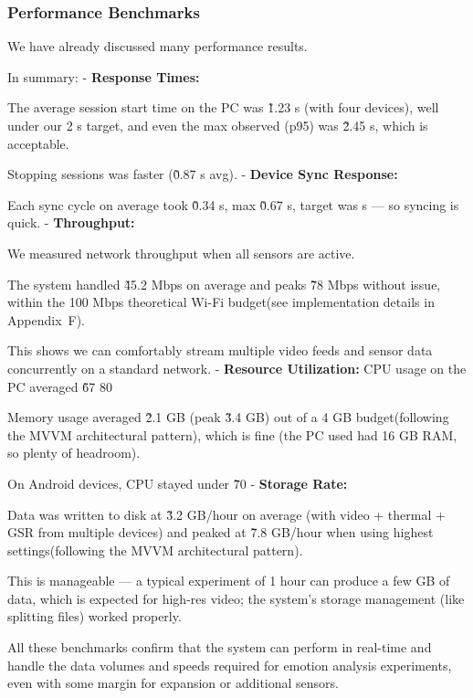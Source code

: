 {{{{{{{\subsubsection{Performance Benchmarks}

We have already discussed many performance results.

In summary: - \textbf{Response Times:}

The average session start time on the PC was \~1.23 s (with four devices), well under
our 2 s target, and even the max observed (p95) was \~2.45 s, which is acceptable.

Stopping sessions was faster (\~0.87 s avg). - \textbf{Device Sync Response:}

Each sync cycle on average took \~0.34 s, max \~0.67 s, target was  s --- so
syncing is quick.  - \textbf{Throughput:}

We measured network throughput when all sensors are active.

The system handled \~45.2 Mbps on average and peaks \~78 Mbps without issue, within
the 100 Mbps theoretical Wi-Fi budget(see implementation details in Appendix~F).

This shows we can comfortably stream multiple video feeds and sensor data
concurrently on a standard network.  - \textbf{Resource Utilization:}
 CPU usage on the PC averaged \~67%
 80%

Memory usage averaged \~2.1 GB (peak \~3.4 GB) out of a 4 GB budget(following the
MVVM architectural pattern), which is fine (the PC used had 16 GB RAM, so plenty of
headroom).

On Android devices, CPU stayed under \~70%
- \textbf{Storage Rate:}

Data was written to disk at \~3.2 GB/hour on average (with video + thermal + GSR from
multiple devices) and peaked at \~7.8 GB/hour when using highest settings(following
the MVVM architectural pattern).

This is manageable --- a typical experiment of 1 hour can produce a few GB of data,
which is expected for high-res video; the system's storage management (like splitting
files) worked properly.

All these benchmarks confirm that the system can perform in real-time and handle the
data volumes and speeds required for emotion analysis experiments, even with some
margin for expansion or additional sensors.

}}}}}}}
